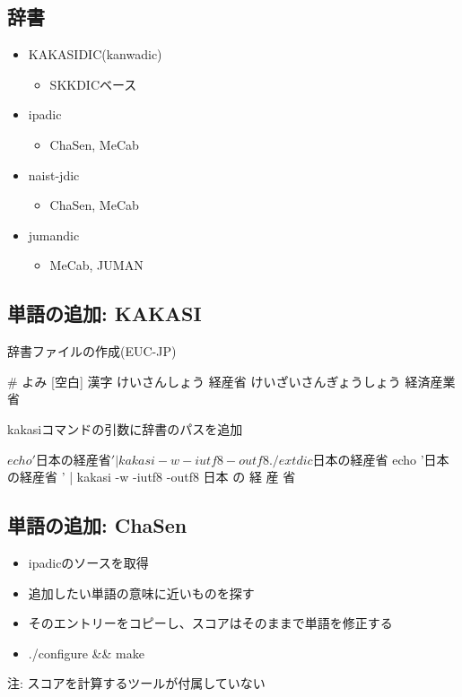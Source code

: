 \documentclass[mingoth,a4paper]{jsarticle}
\begin{document}
\subsection{辞書}

\begin{itemize}
\item KAKASIDIC(kanwadic)
  \begin{itemize}
  \item SKKDICベース
  \end{itemize}
\item ipadic
  \begin{itemize}
  \item ChaSen, MeCab
  \end{itemize}   
\item naist-jdic
  \begin{itemize}
  \item ChaSen, MeCab
  \end{itemize}    
\item jumandic
  \begin{itemize}
  \item MeCab, JUMAN
  \end{itemize}    
\end{itemize}

\subsection{単語の追加: KAKASI}

辞書ファイルの作成(EUC-JP)
\begin{commandline}
# よみ [空白] 漢字
けいさんしょう 経産省
けいざいさんぎょうしょう 経済産業省
\end{commandline}
kakasiコマンドの引数に辞書のパスを追加
\begin{commandline}
$ echo '日本の経産省 ' | kakasi -w -iutf8 -outf8 ./extdic
日本 の 経産省
$ echo '日本の経産省 ' | kakasi -w -iutf8 -outf8
日本 の 経 産 省
\end{commandline}

\subsection{単語の追加: ChaSen}

\begin{itemize}
\item ipadicのソースを取得
\item 追加したい単語の意味に近いものを探す
\item そのエントリーをコピーし、スコアはそのままで単語を修正する
\item ./configure \&\& make 
\end{itemize}
 注: スコアを計算するツールが付属していない
\end{document}
